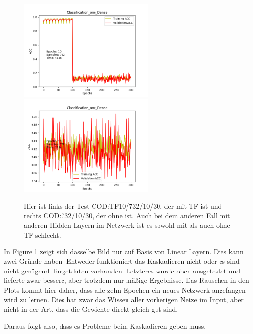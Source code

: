 \begin{figure}[htpb]
    \includegraphics[height=5cm]{../../Plots/ba_plots/classTF/cod_tr.png}
    \includegraphics[height=5cm]{../../Plots/ba_plots/classTF/wocod_tr.png}
    \caption{\label{fig:cod_tr} 
    \small{Hier ist links der Test COD:TF10/732/10/30, der mit TF ist und rechts COD:732/10/30, der ohne ist. Auch bei dem anderen Fall mit 
    anderen Hidden Layern im Netzwerk ist es sowohl mit als auch ohne TF schlecht.}}
\end{figure}

In Figure \ref{fig:cod_tr} zeigt sich dasselbe Bild nur auf Basis von Linear Layern. Dies kann zwei Gründe haben: Entweder funktioniert das Kaskadieren nicht 
oder es sind nicht genügend Targetdaten vorhanden. Letzteres wurde oben ausgetestet und lieferte zwar bessere, aber trotzdem nur mäßige Ergebnisse. 
Das Rauschen in den Plots kommt hier daher, dass alle zehn Epochen ein neues Netzwerk angefangen wird zu lernen. Dies hat zwar das Wissen aller 
vorherigen Netze im Input, aber nicht in der Art, dass die Gewichte direkt gleich gut sind. 

Daraus folgt also, dass es Probleme beim Kaskadieren geben muss. 
